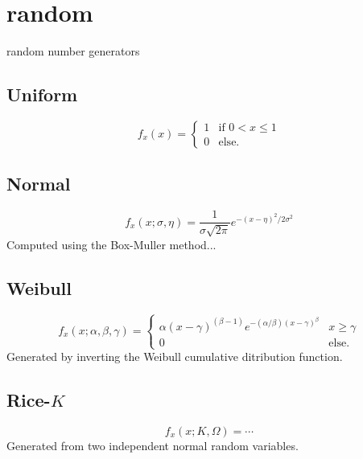 % 
%

\section{random}
\label{module:random}
random number generators

\subsection{Uniform}
\[
    f_x(x) =
    \begin{cases}
        1 & \text{if $0 < x \le 1$} \\
        0 & \text{else}.
    \end{cases}
\]

\subsection{Normal}
\[
    f_x(x;\sigma,\eta) =
        \frac{1}{\sigma \sqrt{2 \pi}}
        e^{-\left(x-\eta\right)^2/{2\sigma^2}}
\]
Computed using the Box-Muller method...

\subsection{Weibull}
\[
    f_x(x;\alpha,\beta,\gamma) =
    \begin{cases}
        \alpha(x-\gamma)^(\beta-1)
        e^{-(\alpha/\beta)(x-\gamma)^\beta} & \text{$x \ge \gamma$} \\
        0 &                                   \text{else}.
    \end{cases}
\]
Generated by inverting the Weibull cumulative ditribution function.


\subsection{Rice-$K$}
\[
    f_x(x;K,\Omega) = \cdots
\]
Generated from two independent normal random variables.

